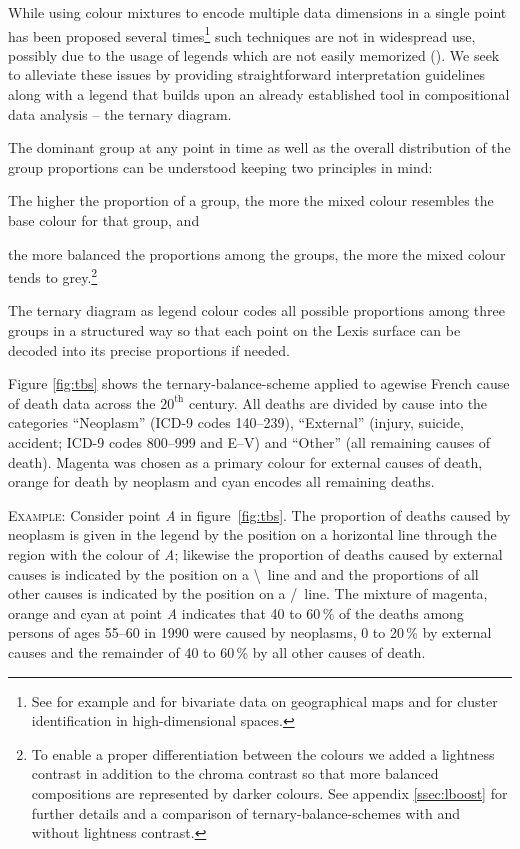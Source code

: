 \documentclass[parskip=half]{scrartcl}
\begin{document}
While using colour mixtures to encode multiple data dimensions in a single point has been proposed several times\footnote{
  See for example \textcite{Trumbo1981} and \textcite{Eyton1984} for bivariate data on geographical maps and \textcite{Ware1988} for cluster identification in high-dimensional spaces.
}
such techniques are not in widespread use, possibly due to the usage of legends which are not easily memorized (\cite{Wainer1980}). We seek to alleviate these issues by providing straightforward interpretation guidelines along with a legend that builds upon an already established tool in compositional data analysis -- the ternary diagram.

The dominant group at any point in time as well as the overall distribution of the group proportions can be understood keeping two principles in mind:

\begin{compactenum}
  \item The higher the proportion of a group, the more the mixed colour resembles the base colour for that group, and
  \item the more balanced the proportions among the groups, the more the mixed colour tends to grey.\footnote{
  To enable a proper differentiation between the colours we added a lightness contrast in addition to the chroma contrast so that more balanced compositions are represented by darker colours. See appendix \ref{ssec:lboost} for further details and a comparison of ternary-balance-schemes with and without lightness contrast.
  }
\end{compactenum}

The ternary diagram as legend colour codes all possible proportions among three groups in a structured way so that each point on the Lexis surface can be decoded into its precise proportions if needed.

Figure \ref{fig:tbs} shows the ternary-balance-scheme applied to agewise French cause of death data across the $20^\text{th}$ century. All deaths are divided by cause into the categories \enquote{Neoplasm} (ICD-9 codes 140--239), \enquote{External} (injury, suicide, accident; ICD-9 codes 800--999 and E--V) and \enquote{Other} (all remaining causes of death). Magenta was chosen as a primary colour for external causes of death, orange for death by neoplasm and cyan encodes all remaining deaths.

\textsc{Example:} Consider point \emph{A} in figure~\ref{fig:tbs}. The proportion of deaths caused by neoplasm is given in the legend by the position on a horizontal line through the region with the colour of \emph{A}; likewise the proportion of deaths caused by external causes is indicated by the position on a \textbackslash~line and and the proportions of all other causes is indicated by the position on a /~line. The mixture of magenta, orange and cyan at point \emph{A} indicates that 40 to 60\,\% of the deaths among persons of ages 55--60 in 1990 were caused by neoplasms, 0 to 20\,\% by external causes and the remainder of 40 to 60\,\% by all other causes of death.
\end{document}
